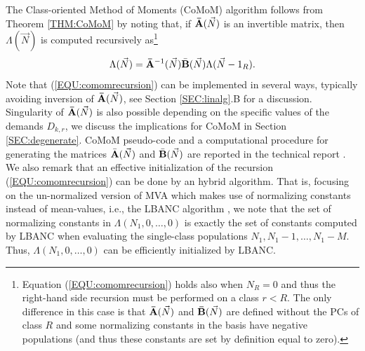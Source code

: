 \documentclass[journal,twocolumn,9.5pt]{IEEEtran}
\newcommand{\comom}[1]{\bar{#1}}
\begin{document}
The Class-oriented Method of Moments (CoMoM) algorithm follows from Theorem \ref{THM:CoMoM} by noting that, if ${\bf \comom{A}}(\vec N)$ is an invertible matrix, then ${\Lambda}(\vec N)$ is computed recursively as\footnote{Equation (\ref{EQU:comomrecursion}) holds also when $N_R=0$ and thus the right-hand side recursion must be performed on a class $r<R$. The only difference in this case is that ${\bf \comom{A}}(\vec N)$ and ${\bf \comom{B}}(\vec N)$ are defined without the PCs of class $R$ and some normalizing constants in the basis have negative populations (and thus these constants are set by definition equal to zero).}
\begin{equation}
\label{EQU:comomrecursion}
{\Lambda}(\vec N)={\bf \comom{A}}^{-1}(\vec N)\comom{\bf B}(\vec N){\Lambda}(\vec N-1_R).
\end{equation}
Note that (\ref{EQU:comomrecursion}) can be implemented in several ways, typically avoiding inversion of ${\bf \comom{A}}(\vec N)$, see Section \ref{SEC:linalg}.B for a discussion. Singularity of ${\bf \comom{A}}(\vec N)$ is also possible depending on the specific values of the demands $D_{k,r}$, we discuss the implications for CoMoM in Section \ref{SEC:degenerate}.
CoMoM pseudo-code and a computational procedure for generating the matrices $\comom{{\bf A}}(\vec N)$ and $\comom{{\bf B}}(\vec N)$ are reported in the technical report \cite{TR}. We also remark that an effective initialization of the recursion (\ref{EQU:comomrecursion}) can be done by an hybrid algorithm. That is, focusing on the un-normalized version of MVA which makes use of normalizing constants instead of mean-values, i.e., the LBANC algorithm \cite{ChaS80,Lam83}, we note that the set of normalizing constants in $\Lambda(N_1,0,\ldots,0)$ is exactly the set of constants computed by LBANC when evaluating the single-class populations $N_1,N_1-1,\ldots,N_1-M$. Thus, $\Lambda(N_1,0,\ldots,0)$ can be efficiently initialized by LBANC.
\end{document}
